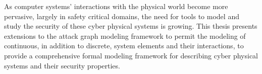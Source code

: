 As computer systems' interactions with the physical world become more pervasive,
largely in safety critical domains, the need for tools to model and study the security
of these cyber physical systems is growing. This thesis presents extensions
to the attack graph modeling framework to permit the modeling of continuous, in addition
to discrete, system elements and their interactions, to provide a comprehensive
formal modeling framework for describing cyber physical systems and their security properties.